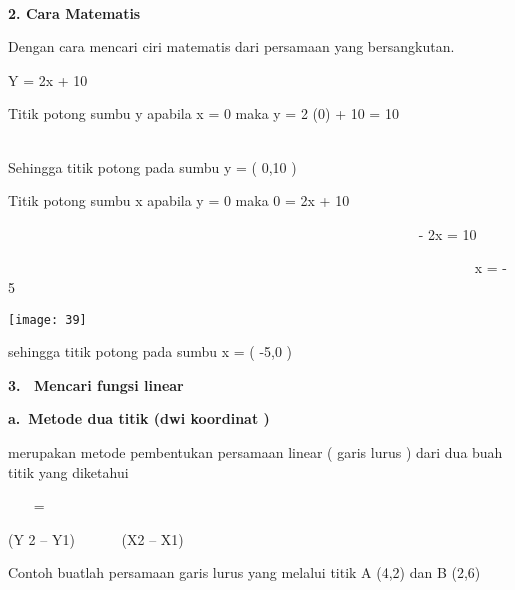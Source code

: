 \documentclass[11pt,fleqn]{book} %
\begin{document}
\begin{myEnumerate}
\begin{itemize}
\noindent 

\noindent 

 

~ ~ ~ ~

\noindent 

\noindent \textbf{2. Cara Matematis}

\noindent \textbf{    }

\textbf{   }Dengan cara mencari ciri matematis dari persamaan yang bersangkutan.

     Y = 2x + 10

\noindent Titik potong sumbu y apabila x = 0 maka y = 2 (0) + 10 = 10~~~~~ ~~~~~~~~~~~~~~~~~~~~~~~~~~~~~~~~~~~~~~~~~~~

\noindent 

\noindent Sehingga titik potong pada sumbu y = ( 0,10 )

\noindent 

\noindent Titik potong sumbu x apabila y = 0 maka 0 = 2x + 10

\noindent 

\noindent ~~~~~~~~~~~~~~~~~~~~~~~~~~~~~~~~~~~~~~~~~~~~~~~~~~~~~~~~~    ~- 2x = 10

\noindent ~~~~~~~~~~~~~~~~~~~~~~~~~~~~~~~~~~~~~~~~~~~~~~~~~~~~~~~~~~~~~~~~~~         x = - 5~

\noindent 

\begin{center}
\noindent \texttt{[image: 39]}
\end{center}

\noindent sehingga titik potong pada sumbu x = ( -5,0 )

\noindent 

\noindent 

\noindent \textbf{3. ~Mencari fungsi linear}

\noindent \textbf{}

\noindent \textbf{a.~Metode dua titik (dwi koordinat )}

merupakan metode pembentukan persamaan linear ( garis lurus ) dari dua buah titik yang diketahui

\noindent {}~~~ =~~

\noindent (Y 2 -- Y1)~~~~~ ~(X2 -- X1)

\noindent 

\noindent Contoh buatlah persamaan garis lurus yang melalui titik A (4,2) dan B (2,6)

\noindent 


\end{itemize}
\end{myEnumerate}
\end{document}
